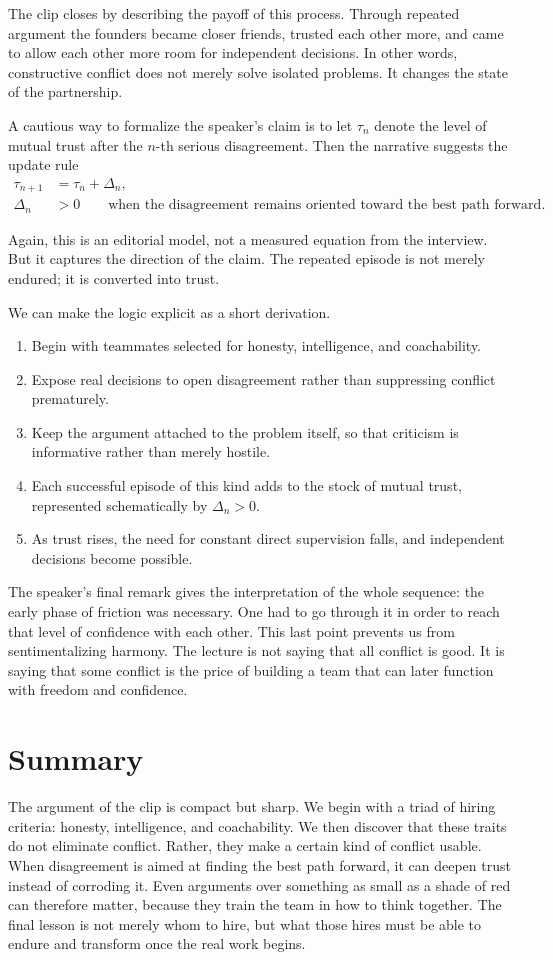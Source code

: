 The clip closes by describing the payoff of this process. Through repeated argument the founders became closer friends, trusted each other more, and came to allow each other more room for independent decisions. In other words, constructive conflict does not merely solve isolated problems. It changes the state of the partnership.

A cautious way to formalize the speaker's claim is to let \(\tau_n\) denote the level of mutual trust after the \(n\)-th serious disagreement. Then the narrative suggests the update rule
\begin{align}
\tau_{n+1} &= \tau_n + \Delta_n,\\
\Delta_n &> 0 \qquad \text{when the disagreement remains oriented toward the best path forward.}
\end{align}

Again, this is an editorial model, not a measured equation from the interview. But it captures the direction of the claim. The repeated episode is not merely endured; it is converted into trust.

We can make the logic explicit as a short derivation.
\begin{enumerate}
\item Begin with teammates selected for honesty, intelligence, and coachability.
\item Expose real decisions to open disagreement rather than suppressing conflict prematurely.
\item Keep the argument attached to the problem itself, so that criticism is informative rather than merely hostile.
\item Each successful episode of this kind adds to the stock of mutual trust, represented schematically by \(\Delta_n>0\).
\item As trust rises, the need for constant direct supervision falls, and independent decisions become possible.
\end{enumerate}

The speaker's final remark gives the interpretation of the whole sequence: the early phase of friction was necessary. One had to go through it in order to reach that level of confidence with each other. This last point prevents us from sentimentalizing harmony. The lecture is not saying that all conflict is good. It is saying that some conflict is the price of building a team that can later function with freedom and confidence.

\section{Summary}

The argument of the clip is compact but sharp. We begin with a triad of hiring criteria: honesty, intelligence, and coachability. We then discover that these traits do not eliminate conflict. Rather, they make a certain kind of conflict usable. When disagreement is aimed at finding the best path forward, it can deepen trust instead of corroding it. Even arguments over something as small as a shade of red can therefore matter, because they train the team in how to think together. The final lesson is not merely whom to hire, but what those hires must be able to endure and transform once the real work begins.